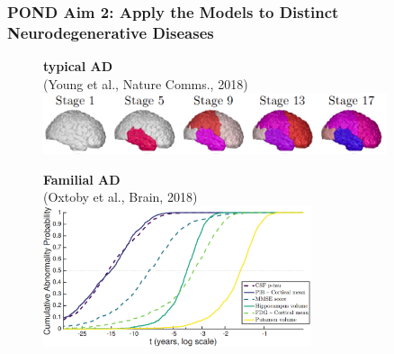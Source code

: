 \documentclass[8pt,xcolor=table,aspectratio=169]{beamer}
\begin{document}
\begin{frame}
\frametitle{POND Aim 2: Apply the Models to Distinct Neurodegenerative Diseases}

\newcommand{\mnpHeight}{3cm}

\vspace{-3em}
  
  
  \hspace{-2em}
  \begin{small}
  \begin{figure}[h]
  \centering
  
      \begin{minipage}[t][\mnpHeight][t]{0.4\linewidth}
    \centering
    \textbf{typical AD}\\ \footnotesize{(Young et al., Nature Comms., 2018)}
    \includegraphics[width=0.9\textwidth]{young_progression.png}
  \end{minipage}
  \begin{minipage}[t][\mnpHeight][t]{0.4\linewidth}
    \centering
    \textbf{Familial AD}\\ \footnotesize{(Oxtoby et al., Brain, 2018)}
    \includegraphics[width=0.7\textwidth,trim=0 0 0 0, clip]{neil_dian.png}
    
    \vspace{2em}
    
  \end{minipage}
  \vspace{2em}
  

\end{figure}
\end{small}
\end{frame}
\end{document}
